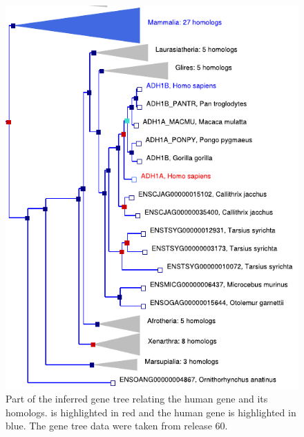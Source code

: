 \begin{figure}
\centering
\includegraphics[scale=0.9]{Figs/adh1a.pdf}
\caption{Part of the inferred gene tree relating the human gene
   and its homologs.  is highlighted in red
  and the human gene  is highlighted in blue. The gene
  tree data were taken from \ens release 60.}
\label{fig_adh1a}
\end{figure}

